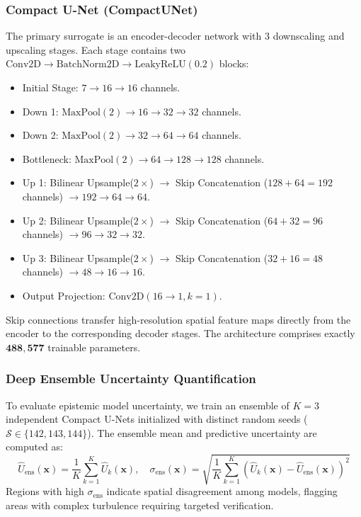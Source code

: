 \documentclass[10pt,twocolumn]{article}
\begin{document}
\subsubsection{Compact U-Net (CompactUNet)}
The primary surrogate is an encoder-decoder network \cite{ronneberger2015u} with $3$ downscaling and upscaling stages. Each stage contains two $\text{Conv2D} \to \text{BatchNorm2D} \to \text{LeakyReLU}(0.2)$ blocks:
\begin{itemize}
    \item Initial Stage: $7 \to 16 \to 16$ channels.
    \item Down 1: $\text{MaxPool}(2) \to 16 \to 32 \to 32$ channels.
    \item Down 2: $\text{MaxPool}(2) \to 32 \to 64 \to 64$ channels.
    \item Bottleneck: $\text{MaxPool}(2) \to 64 \to 128 \to 128$ channels.
    \item Up 1: Bilinear Upsample($2\times$) $\to$ Skip Concatenation ($128+64=192$ channels) $\to 192 \to 64 \to 64$.
    \item Up 2: Bilinear Upsample($2\times$) $\to$ Skip Concatenation ($64+32=96$ channels) $\to 96 \to 32 \to 32$.
    \item Up 3: Bilinear Upsample($2\times$) $\to$ Skip Concatenation ($32+16=48$ channels) $\to 48 \to 16 \to 16$.
    \item Output Projection: $\text{Conv2D}(16 \to 1, k=1)$.
\end{itemize}
Skip connections transfer high-resolution spatial feature maps directly from the encoder to the corresponding decoder stages. The architecture comprises exactly $\mathbf{488,577}$ trainable parameters.

\subsubsection{Deep Ensemble Uncertainty Quantification}
To evaluate epistemic model uncertainty, we train an ensemble of $K = 3$ independent Compact U-Nets initialized with distinct random seeds ($\mathcal{S} \in \{142, 143, 144\}$). The ensemble mean and predictive uncertainty are computed as:
\begin{equation}
    \widehat{U}_{\text{ens}}(\mathbf{x}) = \frac{1}{K} \sum_{k=1}^K \widehat{U}_k(\mathbf{x}), \quad \sigma_{\text{ens}}(\mathbf{x}) = \sqrt{\frac{1}{K} \sum_{k=1}^K \left(\widehat{U}_k(\mathbf{x}) - \widehat{U}_{\text{ens}}(\mathbf{x})\right)^2}
\end{equation}
Regions with high $\sigma_{\text{ens}}$ indicate spatial disagreement among models, flagging areas with complex turbulence requiring targeted verification.
\end{document}
